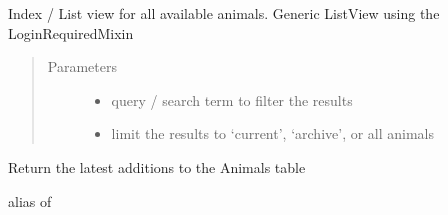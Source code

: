 \documentclass[letterpaper,10pt,openany,oneside,english]{sphinxmanual}
\begin{document}

\begin{fulllineitems}
\label{\detokenize{index:animals.views.AnimalIndexView}}
Index / List view for all available animals.
Generic ListView using the LoginRequiredMixin
\begin{quote}\begin{description}
\item[{Parameters}] \leavevmode\begin{itemize}
\item {} 
 \textendash{} query / search term to filter the results

\item {} 
 \textendash{} limit the results to ‘current’, ‘archive’, or all animals

\end{itemize}

\end{description}\end{quote}

\begin{fulllineitems}
\label{\detokenize{index:animals.views.AnimalIndexView.get_queryset}}
Return the latest additions to the Animals table

\end{fulllineitems}


\begin{fulllineitems}
\label{\detokenize{index:animals.views.AnimalIndexView.model}}
alias of 

\end{fulllineitems}


\end{fulllineitems}

\end{document}
